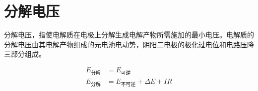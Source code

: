 
\section{分解电压}

分解电压，指使电解质在电极上分解生成电解产物所需施加的最小电压。电解质的分解电压由其电解产物组成的元电池电动势，阴阳二电极的极化过电位和电路压降三部分组成。

\begin{align*}
    E_{\mbox{分解}} &= E_{\mbox{可逆}} \\ 
    E_{\mbox{分解}} &= E_{\mbox{不可逆}} + \Delta E + IR \\ 
\end{align*}
